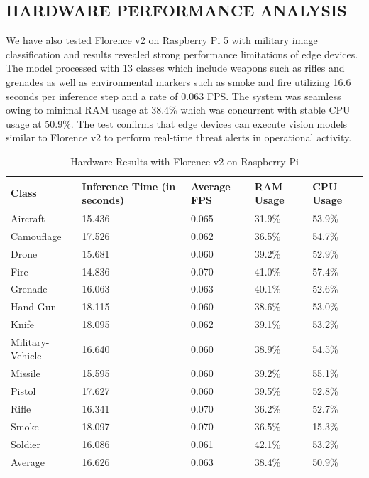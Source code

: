 \documentclass[fleqn,10pt,lineno]{wlpeerj}
\begin{document}
\subsection{HARDWARE PERFORMANCE ANALYSIS}

We have also tested Florence v2 on Raspberry Pi 5 with military image classification and results revealed strong performance limitations of edge devices. The model processed with 13 classes which include weapons such as rifles and grenades as well as environmental markers such as smoke and fire utilizing 16.6 seconds per inference step and a rate of 0.063 FPS. The system was seamless owing to minimal RAM usage at 38.4\% which was concurrent with stable CPU usage at 50.9\%. The test confirms that edge devices can execute vision models similar to Florence v2 to perform real-time threat alerts in operational activity.

\begin{table}[H]
\centering
\renewcommand{\arraystretch}{1.5} %
\caption{Hardware Results with Florence v2 on Raspberry Pi}
\begin{tabular}{|p{2.5cm}|p{2cm}|p{2cm}|p{2cm}|p{2cm}|}
\hline
\textbf{Class} & \textbf{Inference Time (in seconds)} & \textbf{Average FPS} & \textbf{RAM Usage} & \textbf{CPU Usage} \\
\hline
Aircraft        & 15.436 & 0.065 & 31.9\% & 53.9\% \\
Camouflage      & 17.526 & 0.062 & 36.5\% & 54.7\% \\
Drone           & 15.681 & 0.060 & 39.2\% & 52.9\% \\
Fire            & 14.836 & 0.070 & 41.0\% & 57.4\% \\
Grenade         & 16.063 & 0.063 & 40.1\% & 52.6\% \\
Hand-Gun        & 18.115 & 0.060 & 38.6\% & 53.0\% \\
Knife           & 18.095 & 0.062 & 39.1\% & 53.2\% \\
Military-Vehicle & 16.640 & 0.060 & 38.9\% & 54.5\% \\
Missile         & 15.595 & 0.060 & 39.2\% & 55.1\% \\
Pistol          & 17.627 & 0.060 & 39.5\% & 52.8\% \\
Rifle           & 16.341 & 0.070 & 36.2\% & 52.7\% \\
Smoke           & 18.097 & 0.070 & 36.5\% & 15.3\% \\
Soldier         & 16.086 & 0.061 & 42.1\% & 53.2\% \\
\hline
Average         & 16.626 & 0.063 & 38.4\%  & 50.9\% \\
\hline
\end{tabular}
\label{tab:hardware_results}
\end{table}
\end{document}
